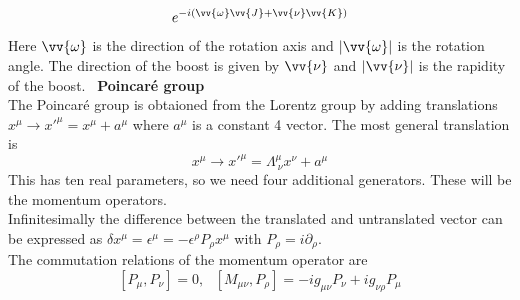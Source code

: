 \documentclass{include/thesisclass}
\newcommand{\df}{\rightarrow}
\newcommand{\p}{\partial}
\newcommand{\eps}{\epsilon}
\newcommand{\sub}[1]{~\newline\newline\textbf{#1}\\}
\begin{document}
\[ e^{-i(\vv{\omega}\vv{J} + \vv{\nu}\vv{K})}\]
Here $\vv{\omega}$ is the direction of the rotation axis and $|\vv{\omega}|$ is the rotation angle. The direction of the boost is given by $\vv{\nu}$ and $|\vv{\nu}|$ is the rapidity of the boost.\newline
\sub{Poincaré group}
The Poincaré group is obtaioned from the Lorentz group by adding translations $x^\mu \df x'^\mu = x^\mu + a^\mu$ where $a^\mu$ is a constant 4 vector. The most general translation is
\[ x^\mu \df x'^\mu = \Lambda^\mu_{~\nu}x^\nu + a^\mu\]
This has ten real parameters, so we need four additional generators. These will be the momentum operators.\\
Infinitesimally the difference between the translated and untranslated vector can be expressed as $\delta x^\mu = \eps^\mu = - \eps^\rho P_\rho x^\mu$ with $P_\rho = i \p_\rho$.\\
The commutation relations of the momentum operator are
\[ [P_\mu, P_\nu] = 0, ~~~[M_{\mu\nu}, P_\rho] = -i g_{\mu\nu}P_\nu + ig_{\nu\rho}P_\mu\]
\end{document}
